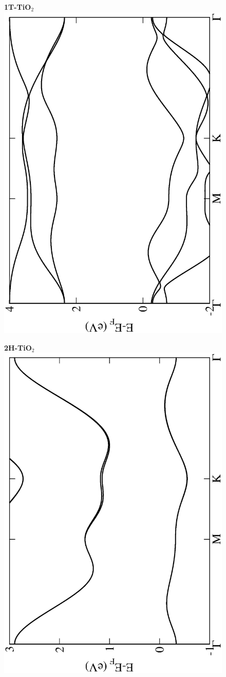 

% 
\begin{figure}[htbp]
  \centering
  {\bfseries \sffamily 1T-TiO$_{2}$}\\
  \includegraphics[width=0.45\linewidth, angle=-90, trim={3cm, 0cm, 2cm, 0cm}, clip]{img/SI_figs/BS/1T-TiO2.eps}
\end{figure}

\begin{figure}[htbp]
  \centering
  {\bfseries \sffamily 2H-TiO$_{2}$}\\
  \includegraphics[width=0.45\linewidth, angle=-90, trim={3cm, 0cm, 2cm, 0cm}, clip]{img/SI_figs/BS/2H-TiO2.eps}
\end{figure}

